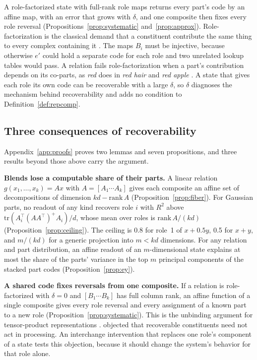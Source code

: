 \documentclass[10pt]{article}
\theoremstyle{plain}
\theoremstyle{remark}
\begin{document}
A role-factorized state with full-rank role maps returns every part's code by an affine map, with an error that grows with $\delta$, and one composite then fixes every role reversal (Propositions~\ref{prop:systematic} and~\ref{prop:approx}). Role-factorization is the classical demand that a constituent contribute the same thing to every complex containing it \citep{fodor1988}. The maps $B_i$ must be injective, because otherwise $e'$ could hold a separate code for each role and two unrelated lookup tables would pass. A relation fails role-factorization when a part's contribution depends on its co-parts, as \emph{red} does in \emph{red hair} and \emph{red apple} \citep{kamp1995}. A state that gives each role its own code can be recoverable with a large $\delta$, so $\delta$ diagnoses the mechanism behind recoverability and adds no condition to Definition~\ref{def:repcomp}.

\subsection{Three consequences of recoverability}
\label{sec:consequences}

Appendix~\ref{app:proofs} proves two lemmas and seven propositions, and three results beyond those above carry the argument.

\textbf{Blends lose a computable share of their parts.} A linear relation $g(x_1, \ldots, x_k) = A x$ with $A = [A_1 \cdots A_k]$ gives each composite an affine set of decompositions of dimension $kd - \mathrm{rank}\,A$ (Proposition~\ref{prop:fiber}). For Gaussian parts, no readout of any kind recovers role $i$ with $R^2$ above $\mathrm{tr}(A_i^{\top}(AA^{\top})^{+}A_i)/d$, whose mean over roles is $\mathrm{rank}\,A/(kd)$ (Proposition~\ref{prop:ceiling}). The ceiling is 0.8 for role~1 of $x + 0.5y$, 0.5 for $x + y$, and $m/(kd)$ for a generic projection into $m < kd$ dimensions. For any relation and part distribution, an affine readout of an $m$-dimensional state explains at most the share of the parts' variance in the top $m$ principal components of the stacked part codes (Proposition~\ref{prop:ey}).

\textbf{A shared code fixes reversals from one composite.} If a relation is role-factorized with $\delta = 0$ and $[B_1 \cdots B_k]$ has full column rank, an affine function of a single composite gives every role reversal and every assignment of a known part to a new role (Proposition~\ref{prop:systematic}). This is the unbinding argument for tensor-product representations \citep{smolensky1990}. \citet{fodor1990} objected that recoverable constituents need not act in processing. An interchange intervention that replaces one role's component of a state tests this objection, because it should change the system's behavior for that role alone.
\end{document}
